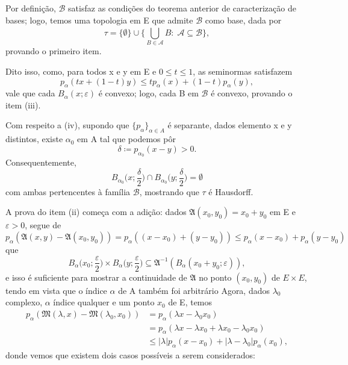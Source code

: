 \documentclass[../distribution_theory_notes.tex]{subfiles}
\begin{document}
\begin{proof*}
	Por definição, \(\mathcal{B}\) satisfaz as condições do teorema anterior de caracterização de bases; logo, temos uma topologia em E que admite \(\mathcal{B}\) como base, dada por
	\[
		\tau =\{\emptyset \}\cup \biggl\{\bigcup_{B\in \mathcal{A}}^{}B:\; \mathcal{A}\subseteq \mathcal{B}\biggr\},
	\]
	provando o primeiro item.

	Dito isso, como, para todos x e y em E e \(0\leq t\leq 1\), as seminormas satisfazem
	\[
		p_{\alpha }(tx + (1-t)y)\leq tp_{\alpha }(x)+ (1-t)p_{\alpha }(y),
	\]
	vale que cada \(B_{\alpha }(x; \varepsilon )\) é convexo; logo, cada B em \(\mathcal{B}\) é convexo, provando o item (iii).

	Com respeito a (iv), supondo que \(\{p_{\alpha }\}_{\alpha \in A}\) é separante, dados elemento x e y distintos, existe \(\alpha_{0}\) em A tal que podemos pôr
	\[
		\delta \coloneqq p_{\alpha_{0}}(x-y) >0.
	\]
	Consequentemente,
	\[
		B_{\alpha_{0}}\biggl(x; \frac{\delta }{2}\biggr)\cap B_{\alpha_{0}}\biggl(y; \frac{\delta }{2}\biggr) = \emptyset
	\]
	com ambas pertencentes à família \(\mathcal{B}\), mostrando que \(\tau \) é Hausdorff.

	A prova do item (ii) começa com a adição: dados \(\mathfrak{A}(x_{0}, y_{0})=x_{0}+y_{0}\) em E e \(\varepsilon >0\), segue de
	\[
		p_{\alpha }(\mathfrak{A}(x, y)-\mathfrak{A}(x_{0}, y_{0}))=p_{\alpha }((x-x_{0})+(y-y_{0}))\leq p_{\alpha }(x-x_{0})+p_{\alpha }(y-y_{0})
	\]
	que
	\[
		B_{\alpha }\biggl(x_{0}; \frac{\varepsilon }{2}\biggr)\times B_{\alpha }\biggl(y; \frac{\varepsilon }{2}\biggr)\subseteq \mathfrak{A}^{-1}(B_{\alpha }(x_{0}+y_{0}; \varepsilon )),
	\]
	e isso é suficiente para mostrar a continuidade de \(\mathfrak{A}\) no ponto \((x_{0}, y_{0})\) de \(E\times E\), tendo em vista que o índice \(\alpha \) de A também foi arbitrário
	Agora, dados \(\lambda_{0}\) complexo, \(\alpha \) índice qualquer e um ponto \(x_{0}\) de E, temos
	\begin{align*}
		p_{\alpha }(\mathfrak{M}(\lambda , x)-\mathfrak{M}(\lambda_{0}, x_{0})) & = p_{\alpha }(\lambda x - \lambda_{0}x_{0})                                   \\
		                                                                        & =p_{\alpha }(\lambda x - \lambda x_{0} + \lambda x_{0} -\lambda_{0}x_{0})     \\
		                                                                        & \leq |\lambda |p_{\alpha }(x-x_{0})+|\lambda -\lambda_{0}|p_{\alpha }(x_{0}),
	\end{align*}
	donde vemos que existem dois casos possíveis a serem considerados:


\end{proof*}
\end{document}
